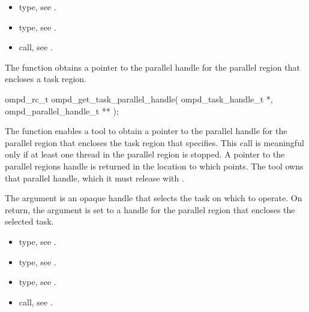 \crossreferences
\begin{itemize}
\item {} type, 
see .

\item {} type, see .

\item {} call, 
see .
\end{itemize}



\label{subsubsubsec:ompd_get_task_parallel_handle}
\summary
The   function obtains a pointer to 
the parallel handle for the parallel region that encloses a task region.

\format
\begin{cspecific}
\begin{ompSyntax}
ompd_rc_t ompd_get_task_parallel_handle(
  ompd_task_handle_t *,
  ompd_parallel_handle_t **
);
\end{ompSyntax}
\end{cspecific}

\descr
The   function enables a tool to obtain a
pointer to the parallel handle for the parallel region that encloses the task 
region that  specifies. This call is meaningful only if at 
least one thread in the parallel region is stopped. A pointer to the parallel 
regions handle is returned in the location to which 
points. The tool owns that parallel handle, which it must release with 
.

\argdesc
The  argument is an opaque handle that selects the task on 
which to operate. On return, the  argument is set 
to a handle for the parallel region that encloses the selected task.

\crossreferences
\begin{itemize}
\item {} type, see .

\item {} type, 
see .

\item {} type, see .

\item {} call, 
see .
\end{itemize}



